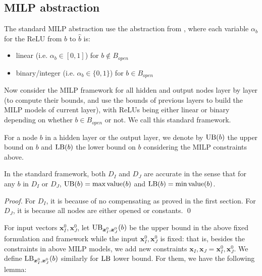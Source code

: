 			
			\subsection{MILP abstraction}
			
			The standard MILP abstraction use the abstraction from \cite{MILP}, 
			where each variable $\alpha_b$ for the ReLU from $b$ to $\hat{b}$ is:
			\begin{itemize}
				\item linear  (i.e. $\alpha_b \in [0,1]$) for $b \notin B_{open}$
				\item binary/integer (i.e. $\alpha_b \in \{0,1\}$) for $b \in B_{open}$
			\end{itemize}
			
			Now consider the MILP framework for all hidden and output nodes layer by layer (to compute their bounds, and use the bounds of previous layers to build the MILP models of current layer), with ReLUs being either linear or binary depending on whether $b \in B_{open}$ or not. We call this standard framework.
			
			For a node $b$ in a hidden layer or the output layer, we denote by $\mathrm{UB}(b)$ the upper bound on $b$ and $\mathrm{LB}(b)$ the lower bound on $b$ considering the MILP constraints above.
			
			
			\begin{lemma}
				In the standard framework, both $D_I$ and $D_J$ are accurate in the sense that for any $b$ in $D_I$ or $D_J$, $\mathrm{UB}(b)=\max{\textrm{value}}(b)$ and $\mathrm{LB}(b)=\min{\textrm{value}}(b)$.
			\end{lemma}
			
			\begin{proof}
				For $D_I$, it is because of no compensating as proved in the first section. For $D_J$, it is because all nodes are either opened or constants. \qed
			\end{proof}
			
			
			
			
			For input vectors $\boldsymbol{x}^0_I,\boldsymbol{x}^0_J$, let $\mathrm{UB}_{\boldsymbol{x}^0_I,\boldsymbol{x}^0_J}(b)$ be the upper bound in the above fixed formulation and framework while the input $\boldsymbol{x}^0_I,\boldsymbol{x}^0_J$ is fixed: that is, besides the constraints in above MILP models, we add new constraints $\boldsymbol{x}_I,\boldsymbol{x}_J=\boldsymbol{x}^0_I,\boldsymbol{x}^0_J$. We  define $\mathrm{LB}_{\boldsymbol{x}^0_I,\boldsymbol{x}^0_J}(b)$ similarly for $\mathrm{LB}$ lower bound. For them, we have the following lemma:
			
